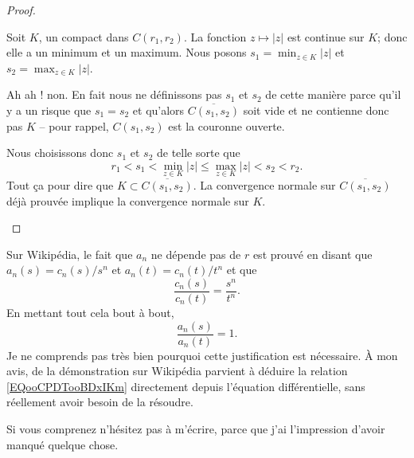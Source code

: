 \begin{proof}
\begin{subproof}
\begin{subproof}
			Soit \( K\), un compact dans \( C(r_1,r_2)\). La fonction \( z\mapsto | z |\) est continue sur \( K\); donc elle a un minimum et un maximum. Nous posons \( s_1=\min_{z\in K}| z |\) et \( s_2=\max_{z\in K}| z |\).

			Ah ah ! non. En fait nous ne définissons pas \( s_1\) et \( s_2\) de cette manière parce qu'il y a un risque que \( s_1=s_2\) et qu'alors \( \overline{ C(s_1,s_2) }\) soit vide et ne contienne donc pas \( K\) -- pour rappel, \( C(s_1,s_2)\) est la couronne ouverte.

			Nous choisissons donc \( s_1\) et \( s_2\) de telle sorte que
			\begin{equation}
				r_1 <s_1 <\min_{z\in K}| z |\leq \max_{z\in K}| z | <s_2 <r_2.
			\end{equation}
			Tout ça pour dire que \( K\subset \overline{ C(s_1,s_2) }\). La convergence normale sur \( \overline{ C(s_1,s_2) }\) déjà prouvée implique la convergence normale sur \( K\).
		\end{subproof}
	\end{subproof}
\end{proof}

\begin{probleme}        \label{PROPBooYWDNooMXVPLJ}
	Sur Wikipédia\cite{BIBooUBUAooHyhrlg}, le fait que \( a_n\) ne dépende pas de \( r\) est prouvé en disant que \( a_n(s)=c_n(s)/s^n\) et \( a_n(t)=c_n(t)/t^n\) et que
	\begin{equation}        \label{EQooCPDTooBDxIKm}
		\frac{ c_n(s) }{ c_n(t) }=\frac{ s^n }{ t^n }.
	\end{equation}
	En mettant tout cela bout à bout,
	\begin{equation}
		\frac{ a_n(s) }{ a_n(t) }=1.
	\end{equation}
	Je ne comprends pas très bien pourquoi cette justification est nécessaire. À mon avis,  de la démonstration sur Wikipédia parvient à déduire la relation \eqref{EQooCPDTooBDxIKm} directement depuis l'équation différentielle, sans réellement avoir besoin de la résoudre.

	Si vous comprenez n'hésitez pas à m'écrire, parce que j'ai l'impression d'avoir manqué quelque chose.
\end{probleme}

